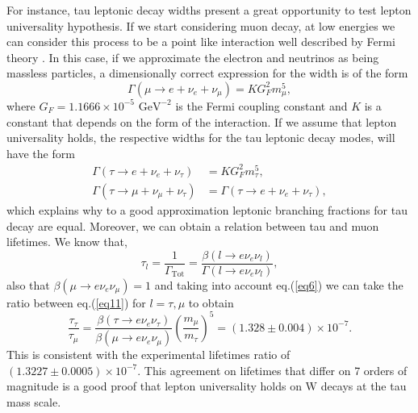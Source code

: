For instance, tau leptonic decay widths present a great opportunity to test lepton universality hypothesis. If we start considering muon decay, at low energies we can consider this process to be a point like interaction well described by Fermi theory \cite{FermiTheory}. In this case, if we approximate the electron and neutrinos as being massless particles, a dimensionally correct expression for the width is of the form
\begin{equation}
	\Gamma(\mu\to e+\nu_e +\nu_\mu)=KG_{F}^{2}m_{\mu}^{5},
\end{equation} 
where $G_F=1.1666\times 10^{-5} \text{ GeV}^{-2}$ is the Fermi coupling constant and $K$ is a constant that depends on the form of the interaction. If we assume that lepton universality holds, the respective widths for the tau leptonic decay modes, will have the form
\begin{align}
\Gamma(\tau\to e+\nu_e +\nu_\tau)&=KG_{F}^{2}m_{\tau}^{5},
\\
\Gamma(\tau\to \mu+\nu_\mu +\nu_\tau)&=\Gamma(\tau\to e+\nu_e +\nu_\tau),
\end{align}  
which explains why to a good approximation leptonic branching fractions for tau decay are equal. Moreover, we can obtain a relation between tau and muon lifetimes. We know that,
\begin{equation}
	\tau_l=\frac{1}{\Gamma_\text{Tot}}=\frac{\beta(l\to e\nu_e \nu_l)}{\Gamma(l\to e\nu_e \nu_l)},
	\label{eq11}
\end{equation}
also that $\beta(\mu\to e\nu_e \nu_\mu)=1$ and taking into account eq.(\ref{eq6}) we can take the ratio between eq.(\ref{eq11}) for $l=\tau ,\mu$ to obtain
\begin{equation}
\frac{\tau_\tau}{\tau_\mu}=\frac{\beta(\tau\to e\nu_e \nu_\tau)}{\beta(\mu\to e\nu_e \nu_\mu)}\left(\frac{m_\mu}{m_\tau}\right)^5=(1.328\pm 0.004)\times 10^{-7}.
\end{equation}
This is consistent with the experimental lifetimes ratio of $(1.3227\pm 0.0005)\times10^{-7}$. This agreement on lifetimes that differ on 7 orders of magnitude is a good proof that lepton universality holds on W decays at the tau mass scale.

